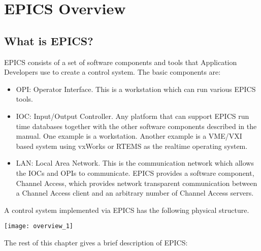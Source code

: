 





\chapter{EPICS Overview}

\section{What is EPICS?}

EPICS consists of a set of software components and tools that Application Developers use to create a control system. The 
basic components are:

\begin{itemize}\item OPI: Operator Interface. This is a workstation which can run various EPICS tools.

\item IOC: Input/Output Controller. Any platform that can support EPICS run time databases together with the other 
software components described in the manual. One example is a workstation. Another example is a VME/VXI 
based system using vxWorks or RTEMS as the realtime operating system.

\item LAN: Local Area Network. This is the communication network which allows the IOCs and OPIs to communicate. 
EPICS provides a software component, Channel Access, which provides network transparent communication 
between a Channel Access client and an arbitrary number of Channel Access servers.

\end{itemize}A control system implemented via EPICS has the following physical structure.

\texttt{[image: overview\_1]}

The rest of this chapter gives a brief description of EPICS:

